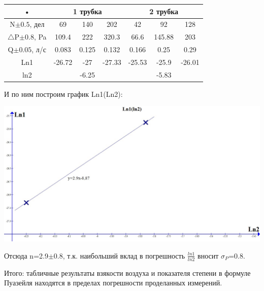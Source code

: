\documentclass[a4paper,12pt]{article} %
\begin{document}
\begin{tabular}{|c|c|c|c|c|c|c|}
\hline 
• & \multicolumn{3}{|c|}{1 трубка} & \multicolumn{3}{|c|}{2 трубка} \\ 
\hline 
N$\pm0.5$, дел & 69 & 140 & 202 & 42 & 92 & 128 \\ 
\hline 
$\triangle$P$\pm0.8$, Pa & 109.4 & 222 & 320.3 & 66.6 & 145.88 & 203 \\ 
\hline 
Q$\pm0.05$, л/с & 0.083 & 0.125 & 0.132 & 0.166 & 0.25 & 0.29 \\ 
\hline 
Ln1 & -26.72 & -27 & -27.33 & -25.53 & -25.9 & -26.01 \\ 
\hline 
ln2  & \multicolumn{3}{|c|}{-6.25} & \multicolumn{3}{|c|}{-5.83} \\ 
\hline 
\end{tabular} 


И по ним построим график Ln1(Ln2):
\begin{center}
\includegraphics[scale=0.33]{1333}
\end{center}

Отсюда n=2.9$\pm$0.8, т.к. наибольший вклад в погрешность $\frac{ln1}{ln2}$ вносит $\sigma_P$=0.8.

Итого: табличные результаты взякости воздуха и показателя степени в формуле Пуазейля находятся в пределах погрешности проделанных измерений.
\end{document}
